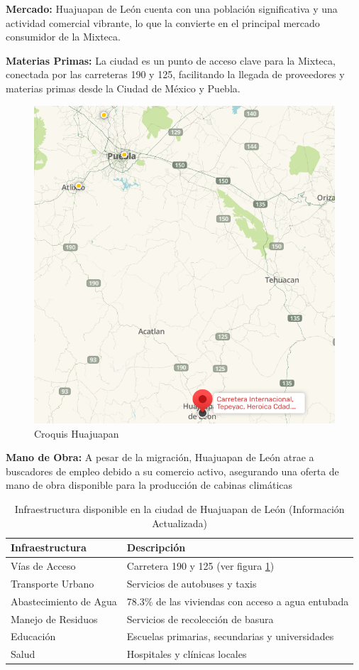 \textbf{Mercado:} Huajuapan de León cuenta con una población significativa y una actividad comercial vibrante, lo que la convierte en el principal mercado consumidor de la Mixteca.

\textbf{Materias Primas:} La ciudad es un punto de acceso clave para la Mixteca, conectada por las carreteras 190 y 125, facilitando la llegada de proveedores y materias primas desde la Ciudad de México y Puebla.

\begin{figure}[H]
    \centering	
    \includegraphics[width=.7\textwidth]{img/carretera190125.png} 
    \caption{Croquis Huajuapan}
\label{fig:croquis190125}
\end{figure}

\textbf{Mano de Obra:} A pesar de la migración, Huajuapan de León atrae a buscadores de empleo debido a su comercio activo, asegurando una oferta de mano de obra disponible para la producción de cabinas climáticas
\newpage

\begin{table}[h!]
\centering
\begin{tabular}{|l|l|}
\hline
\textbf{Infraestructura} & \textbf{Descripción} \\
\hline
Vías de Acceso & Carretera 190 y 125 (ver figura \ref{fig:croquis190125}) \\
\hline
Transporte Urbano & Servicios de autobuses y taxis \\
\hline
Abastecimiento de Agua & 78.3\% de las viviendas con acceso a agua entubada \\
\hline
Manejo de Residuos & Servicios de recolección de basura \\
\hline
Educación & Escuelas primarias, secundarias y universidades \\
\hline
Salud & Hospitales y clínicas locales \\
\hline
\end{tabular}
\caption{Infraestructura disponible en la ciudad de Huajuapan de León (Información Actualizada)}
\label{table:infrahuajuapan}
\end{table}

